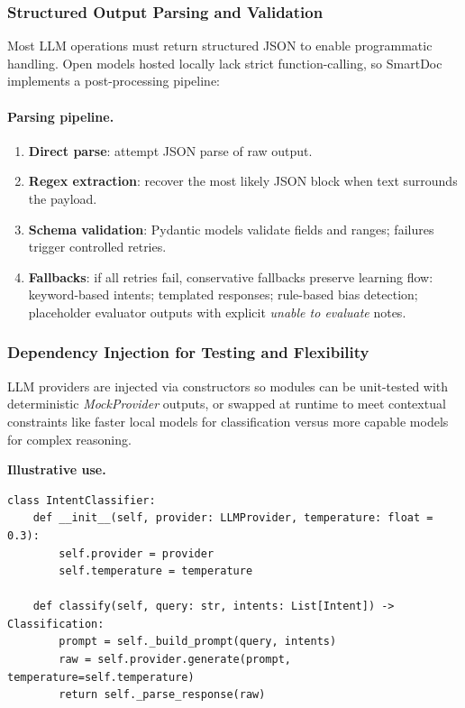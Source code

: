 \subsubsection{Structured Output Parsing and Validation}

Most LLM operations must return structured JSON to enable programmatic handling.
Open models hosted locally lack strict function-calling, so SmartDoc implements
a post-processing pipeline:

\paragraph{Parsing pipeline.}
\begin{enumerate}
  \item \textbf{Direct parse}: attempt JSON parse of raw output.
  \item \textbf{Regex extraction}: recover the most likely JSON block when text surrounds
        the payload.
  \item \textbf{Schema validation}: Pydantic models validate fields and ranges; failures
        trigger controlled retries.
  \item \textbf{Fallbacks}: if all retries fail, conservative fallbacks preserve learning flow:
        keyword-based intents; templated responses; rule-based bias detection; placeholder
        evaluator outputs with explicit \emph{unable to evaluate} notes.
\end{enumerate}

\subsubsection{Dependency Injection for Testing and Flexibility}

LLM providers are injected via constructors so modules can be unit-tested with
deterministic \textit{MockProvider} outputs, or swapped at runtime to meet
contextual constraints like faster local models for classification versus
more capable models for complex reasoning.

\noindent\textbf{Illustrative use.}
\begin{verbatim}
class IntentClassifier:
    def __init__(self, provider: LLMProvider, temperature: float = 0.3):
        self.provider = provider
        self.temperature = temperature

    def classify(self, query: str, intents: List[Intent]) -> Classification:
        prompt = self._build_prompt(query, intents)
        raw = self.provider.generate(prompt, temperature=self.temperature)
        return self._parse_response(raw)
\end{verbatim}

